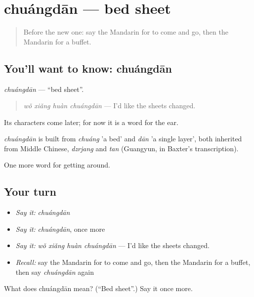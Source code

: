 \section[chuángdān]{chuángdān — bed sheet}

\label{lesson:ZH-C427-chuangdan}



\begin{quote}
Before the new one: say the Mandarin for to come and go, then the Mandarin for a buffet.
\end{quote}

\subsection*{You'll want to know: chuángdān}
\emph{chuángdān} — \textquotedblleft{}bed sheet\textquotedblright{}.

\begin{quote}
\emph{wǒ xiǎng huàn chuángdān} — I'd like the sheets changed.
\end{quote}

Its characters come later; for now it is a word for the ear.

\begin{cousinweb}
\emph{chuángdān} is built from \emph{chuáng} 'a bed' and \emph{dān} 'a single layer', both inherited from Middle Chinese, \emph{dzrjang} and \emph{tan} (Guangyun, in Baxter's transcription).
\end{cousinweb}

\begin{grammarlens}[title={What you've built}]
One more word for getting around.
\end{grammarlens}

\subsection*{Your turn}
\begin{itemize}
\raggedright
  \item \emph{Say it:} \emph{chuángdān}
  \item \emph{Say it:} \emph{chuángdān}, once more
  \item \emph{Say it:} \emph{wǒ xiǎng huàn chuángdān} — I'd like the sheets changed.
  \item \emph{Recall:} say the Mandarin for to come and go, then the Mandarin for a buffet, then say \emph{chuángdān} again
\end{itemize}

\begin{tcolorbox}[breakable,colback=teal!4,colframe=teal!35!black,title={Before you move on}]
What does chuángdān mean? (\textquotedblleft{}Bed sheet\textquotedblright{}.) Say it once more.
\end{tcolorbox}
